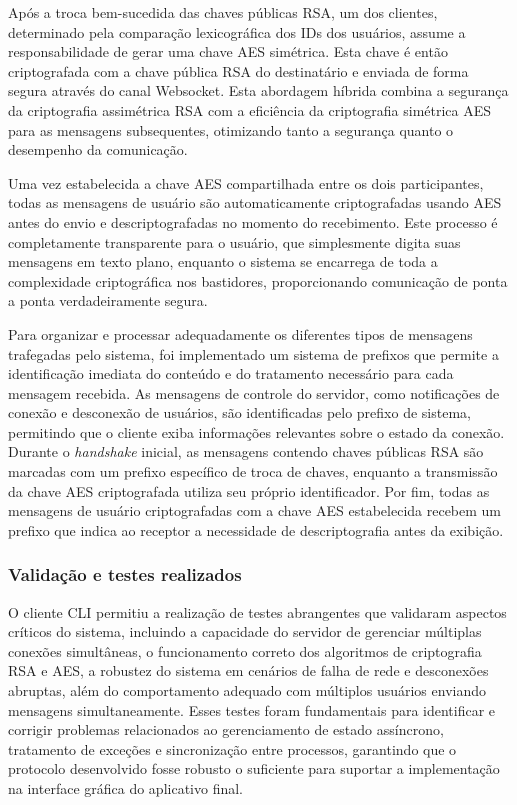 Após a troca bem-sucedida das chaves públicas \acs{RSA}, um dos clientes,
determinado pela comparação lexicográfica dos \acsp{ID} dos usuários,
assume a responsabilidade de gerar uma chave \acs{AES} simétrica. Esta
chave é então criptografada com a chave pública \acs{RSA} do destinatário e
enviada de forma segura através do canal Websocket. Esta abordagem
híbrida combina a segurança da criptografia assimétrica \acs{RSA} com a
eficiência da criptografia simétrica \acs{AES} para as mensagens
subsequentes, otimizando tanto a segurança quanto o desempenho da comunicação.

Uma vez estabelecida a chave \acs{AES} compartilhada entre os dois
participantes, todas as mensagens de usuário são automaticamente
criptografadas usando \acs{AES} antes do envio e descriptografadas no
momento do recebimento. Este processo é completamente transparente
para o usuário, que simplesmente digita suas mensagens em texto
plano, enquanto o sistema se encarrega de toda a complexidade
criptográfica nos bastidores, proporcionando comunicação de ponta a
ponta verdadeiramente segura.

Para organizar e processar adequadamente os diferentes tipos de
mensagens trafegadas pelo sistema, foi implementado um sistema de
prefixos que permite a identificação imediata do conteúdo e do
tratamento necessário para cada mensagem recebida. As mensagens de
controle do servidor, como notificações de conexão e desconexão de
usuários, são identificadas pelo prefixo de sistema, permitindo que o
cliente exiba informações relevantes sobre o estado da conexão.
Durante o \textit{handshake} inicial, as mensagens contendo chaves públicas
\acs{RSA} são marcadas com um prefixo específico de troca de chaves,
enquanto a transmissão da chave \acs{AES} criptografada utiliza seu próprio
identificador. Por fim, todas as mensagens de usuário criptografadas
com a chave \acs{AES} estabelecida recebem um prefixo que indica ao
receptor a necessidade de descriptografia antes da exibição.

\subsubsection{Validação e testes realizados}

O cliente \acs{CLI} permitiu a realização de testes abrangentes que
validaram aspectos críticos do sistema, incluindo a capacidade do
servidor de gerenciar múltiplas conexões simultâneas, o funcionamento
correto dos algoritmos de criptografia \acs{RSA} e \acs{AES}, a robustez do
sistema em cenários de falha de rede e desconexões abruptas, além do
comportamento adequado com múltiplos usuários enviando mensagens
simultaneamente. Esses testes foram fundamentais para identificar e
corrigir problemas relacionados ao gerenciamento de estado
assíncrono, tratamento de exceções e sincronização entre processos,
garantindo que o protocolo desenvolvido fosse robusto o suficiente
para suportar a implementação na interface gráfica do aplicativo final.

